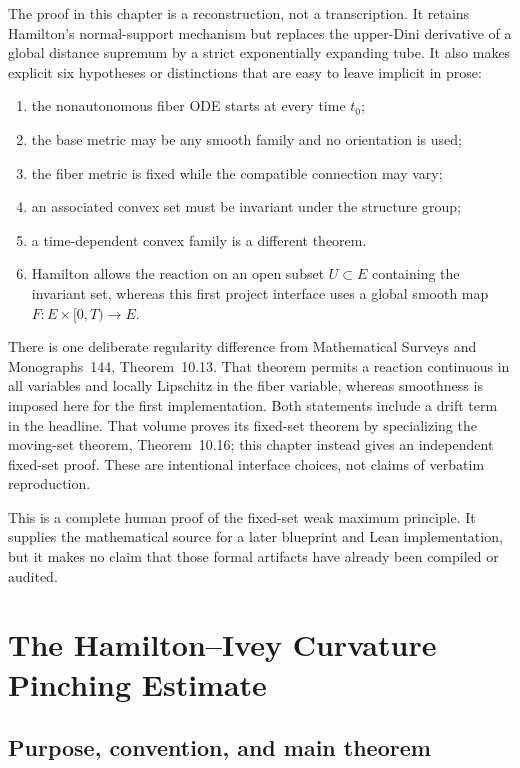 \documentclass[10pt]{coll-l}
\theoremstyle{definition}
\theoremstyle{remark}
\numberwithin{section}{chapter}
\numberwithin{equation}{chapter}
\begin{document}
The proof in this chapter is a reconstruction, not a transcription.  It
retains Hamilton's normal-support mechanism but replaces the upper-Dini
derivative of a global distance supremum by a strict exponentially expanding
tube.  It also makes explicit six hypotheses or distinctions that are easy
to leave implicit in prose:
\begin{enumerate}
\item the nonautonomous fiber ODE starts at every time $t_0$;
\item the base metric may be any smooth family and no orientation is used;
\item the fiber metric is fixed while the compatible connection may vary;
\item an associated convex set must be invariant under the structure group;
\item a time-dependent convex family is a different theorem.
\item Hamilton allows the reaction on an open subset $U\subset E$ containing
      the invariant set, whereas this first project interface uses a global
      smooth map $F:E\times[0,T)\to E$.
\end{enumerate}

There is one deliberate regularity difference from Mathematical Surveys and
Monographs~144, Theorem~10.13.  That theorem permits a reaction continuous in
all variables and locally Lipschitz in the fiber variable, whereas smoothness
is imposed here for the first implementation.  Both statements include a
drift term in the headline.  That volume proves its fixed-set theorem by
specializing the moving-set theorem, Theorem~10.16; this chapter instead
gives an independent fixed-set proof.  These are intentional interface
choices, not claims of verbatim reproduction.

This is a complete human proof of the fixed-set weak maximum principle.
It supplies the mathematical source for a later blueprint and Lean
implementation, but it makes no claim that those formal artifacts have
already been compiled or audited.

\chapter{The Hamilton--Ivey Curvature Pinching Estimate}
\label{ch:hamilton-ivey}

\section{Purpose, convention, and main theorem}
\label{sec:hi-purpose}
\end{document}
